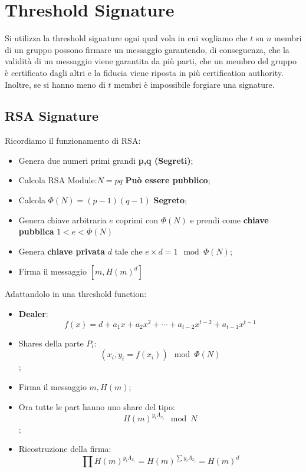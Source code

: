\documentclass{book}
\begin{document}
\section{Threshold Signature}
Si utilizza la threshold signature ogni qual vola in cui vogliamo che \(t\) su \(n\) membri di un gruppo possono firmare un messaggio garantendo, di conseguenza, che la validità di un messaggio viene garantita da più parti, che un membro del gruppo è certificato dagli altri e la fiducia viene riposta in più certification authority\@.
Inoltre, se si hanno meno di \(t\) membri è impossibile forgiare una signature.
\subsection{RSA Signature}
Ricordiamo il funzionamento di RSA:\begin{itemize}
	\item Genera due numeri primi grandi \textbf{p,q (Segreti)};\@
	\item Calcola RSA Module:\(N=pq\) \textbf{Può essere pubblico};\@
	\item Calcola \(\Phi(N)=(p-1)(q-1)\) \textbf{Segreto};\@
	\item Genera chiave arbitraria \(e\) coprimi con \(\Phi(N)\) e prendi come \textbf{chiave pubblica} \(1<e<\Phi(N)\)
	\item Genera \textbf{chiave privata} \(d\) tale che \(e\times d=1\mod{\Phi(N)}\);
	\item Firma il messaggio \([m,{H(m)}^{d}]\)
\end{itemize}
Adattandolo in una threshold function:\begin{itemize}
	\item \textbf{Dealer}:\begin{equation*}
		      f(x)=d+a_{1}x+a_{2}x^{2}+\cdots +a_{t-2}x^{t-2}+a_{t-1}x^{t-1}
	      \end{equation*}
	\item Shares della parte \(P_{i}\):\begin{equation*}
		      (x_{i},y_{i}=f(x_{i}))\mod{\Phi(N)}
	      \end{equation*};
	\item Firma il messaggio \(m,H(m)\);
	\item Ora tutte le part hanno uno share del tipo:\begin{equation*}
		      {H(m)}^{y_{i}\Lambda_{x_{i}}}\mod{N}
	      \end{equation*};
	\item Ricostruzione della firma:\begin{equation*}
		      \prod {H(m)}^{y_{i}\Lambda_{x_{i}}}={H(m)}^{\sum{y_{i}\Lambda_{x_{i}}}}={H(m)}^{d}
	      \end{equation*}
\end{itemize}
\end{document}
